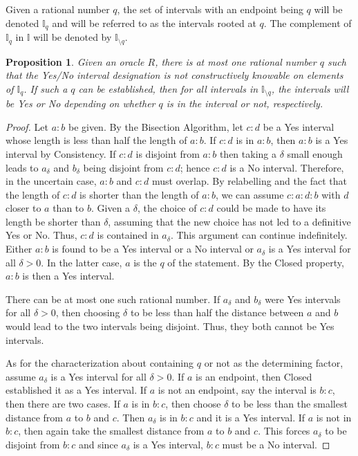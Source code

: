 \documentclass[12pt]{article}
\newtheorem{proposition}{Proposition}[section]
\begin{document}
Given a rational number $q$, the set of intervals with an endpoint being $q$ will be denoted $\mathbb{I}_q$ and will be referred to as the intervals rooted at $q$. The complement of $\mathbb{I}_q$ in $\mathbb{I}$ will be denoted by $\mathbb{I}_{\setminus q}$.

\begin{proposition}
    Given an oracle $R$, there is at most one rational number $q$ such that the Yes/No interval designation is not constructively knowable on elements of $\mathbb{I}_q$. If such a $q$ can be established, then for all intervals in $\mathbb{I}_{\setminus q}$, the intervals will be Yes or No depending on whether $q$ is in the interval or not, respectively. 
\end{proposition}

\begin{proof}
    Let $a:b$ be given. By the Bisection Algorithm, let $c:d$ be a Yes interval whose length is less than half the length of $a:b$. If $c:d$ is in $a:b$, then $a:b$ is a Yes interval by Consistency. If $c:d$ is disjoint from $a:b$ then taking a $\delta$ small enough leads to $a_\delta$ and $b_\delta$ being disjoint from $c:d$; hence $c:d$ is a No interval. Therefore, in the uncertain case, $a:b$ and $c:d$ must overlap. By relabelling and the fact that the length of $c:d$ is shorter than the length of $a:b$, we can assume $c:a:d:b$ with $d$ closer to $a$ than to $b$. Given a $\delta$, the choice of $c:d$ could be made to have its length be shorter than $\delta$, assuming that the new choice has not led to a definitive Yes or No. Thus, $c:d$ is contained in $a_\delta$. This argument can continue indefinitely. Either $a:b$ is found to be a Yes interval or a No interval or $a_\delta$ is a Yes interval for all $\delta >0$. In the latter case, $a$ is the $q$ of the statement. By the Closed property, $a:b$ is then a Yes interval. 

    There can be at most one such rational number. If $a_\delta$ and $b_\delta$ were Yes intervals for all $\delta > 0$, then choosing $\delta$ to be less than half the distance between $a$ and $b$ would lead to the two intervals being disjoint. Thus, they both cannot be Yes intervals. 

    As for the characterization about containing $q$ or not as the determining factor, assume $a_\delta$ is a Yes interval for all $\delta > 0$. If $a$ is an endpoint, then Closed established it as a Yes interval. If $a$ is not an endpoint, say the interval is $b:c$, then there are two cases. If $a$ is in $b:c$, then choose $\delta$ to be less than the smallest distance from $a$ to $b$ and $c$. Then $a_\delta$ is in $b:c$ and it is a Yes interval. If $a$ is not in $b:c$, then again take the smallest distance from $a$ to $b$ and $c$. This forces $a_\delta$ to be disjoint from $b:c$ and since $a_\delta$ is a Yes interval, $b:c$ must be a No interval. 
 \end{proof}
\end{document}
